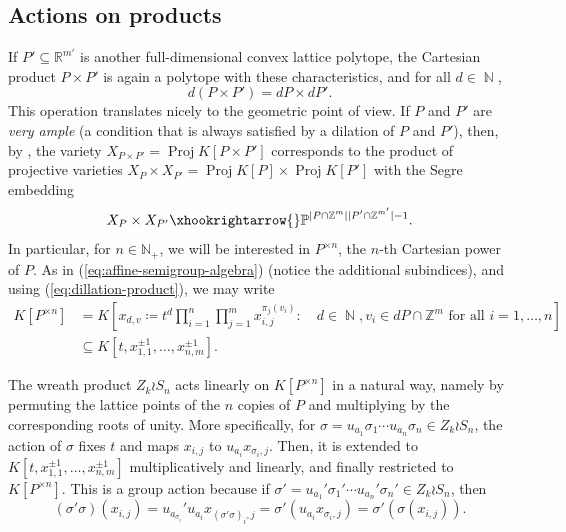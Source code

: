 \documentclass[a4paper,12pt]{amsart}
\theoremstyle{plain}
\theoremstyle{definition}
\theoremstyle{remark}
\DeclareMathOperator{\NN}{\mathbb{N}}
\DeclareMathOperator{\Proj}{Proj}
\begin{document}
\subsection{Actions on products}\label{subsection:actions-on-products}
If $P' \subseteq \mathbb{R}^{m'}$ is another full-dimensional convex lattice polytope, the Cartesian product
$P \times P'$ is again a polytope with these characteristics, and for all $d \in \NN$,
\begin{equation}\label{eq:dillation-product}
    d(P \times P') = dP \times dP'.
\end{equation}
This operation translates nicely to the geometric point of view. If $P$ and $P'$ are \emph{very ample} (a condition that is always satisfied by a dilation of $P$ and $P'$), then, by \cite[Theorem 2.4.7]{cox-little-toric}, the variety $X_{P \times P'} = \Proj K[P \times P']$ corresponds to the product of projective varieties $X_{P} \times X_{P'} = \Proj K[P] \times \Proj K[P']$ with the Segre embedding
\[
X_{P} \times X_{P'} \xhookrightarrow{} \mathbb{P}^{|P \cap \mathbb{Z}^m||P' \cap \mathbb{Z}^{m'}| - 1}.
\]
In particular, for $n \in \mathbb{N}_+$, we will be interested in $P^{\times n}$, the $n$-th Cartesian power of $P$. As in (\ref{eq:affine-semigroup-algebra}) (notice the additional subindices), and using (\ref{eq:dillation-product}), we may write
\begin{align*}
    K[P^{\times n}] &= K \left [ x_{d, v} \coloneq t^d \prod_{i = 1}^n \prod_{j = 1}^m x_{i, j}^{\pi_j(v_i)}: \quad d \in \NN, v_i \in dP \cap \mathbb{Z}^{m} \text{ for all } i = 1, \ldots, n \right ] \\
    &\subseteq K[t, x_{1, 1}^{\pm 1}, \ldots, x_{n, m}^{\pm 1}].
\end{align*}

The wreath product $Z_k \wr S_n$ acts linearly on $K[P^{\times n}]$ in a natural way, namely by permuting the lattice points of the $n$ copies of $P$ and multiplying by the corresponding roots of unity. More specifically, for $\sigma = u_{a_1}\sigma_1 \cdots u_{a_n}\sigma_n \in Z_k \wr S_n$, the action of $\sigma$ fixes $t$ and maps $x_{i, j}$ to $u_{a_i} x_{\sigma_i, j}$. Then, it is extended to $K[t, x_{1, 1}^{\pm 1}, \ldots, x_{n, m}^{\pm 1}]$ multiplicatively and linearly, and finally restricted to $K[P^{\times n}]$. This is a group action because if $\sigma' = u_{a_1}'\sigma_1' \cdots u_{a_n}'\sigma_n' \in Z_k \wr S_n$, then
\[
(\sigma'\sigma)(x_{i, j}) = u_{a_{\sigma_i}}'u_{a_i}x_{(\sigma'\sigma)_i, j} = \sigma'(u_{a_i} x_{\sigma_i, j}) = \sigma'(\sigma(x_{i, j})).
\]
\end{document}
